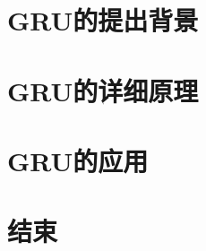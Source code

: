 \documentclass[aspectratio=1610, 10pt, compress]{beamer}
\title[大创中期]{应用统计2：时间序列~~{\small 之}~~第二次作业\texorpdfstring{\\ \vspace{0.3cm}}}
\subtitle{ GRU模型}
\author[221870091 蔡如意]{221870091 蔡如意}
\institute[指导老师：刘帆]{指导老师：{\large 刘帆}}
\date[]{{南京大学}\;-\;工程管理学院}
\begin{document}
    \begin{frame}
        \Background
        \thispagestyle{empty}
        \addtocounter{framenumber}{-1}
        \titlepage        
    \end{frame}

    \section{GRU的提出背景}
        
    \section{GRU的详细原理}
        
    \section{GRU的应用}
        
           



    \section{结束}
        \begin{frame}
            \Background
            \centering
            \Huge {}
        \end{frame}
\end{document}
